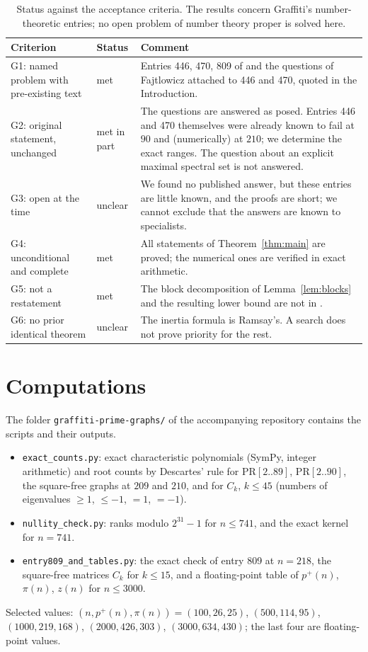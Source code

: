\documentclass[11pt]{amsart}
\theoremstyle{definition}
\theoremstyle{remark}
\newcommand{\PR}{\mathrm{PR}}
\newcommand{\pp}{p^{+}}
\begin{document}
\begin{table}[ht]
\centering\small
\begin{tabular}{@{}p{}p{}p{}@{}}
\toprule
Criterion & Status & Comment\\
\midrule
G1: named problem with pre-existing text & met & Entries 446, 470, 809 of \cite{WOW} and the questions of Fajtlowicz attached to 446 and 470, quoted in the Introduction.\\
G2: original statement, unchanged & met in part & The questions are answered as posed. Entries 446 and 470 themselves were already known to fail at $90$ and (numerically) at $210$; we determine the exact ranges. The question about an explicit maximal spectral set is not answered.\\
G3: open at the time & unclear & We found no published answer, but these entries are little known, and the proofs are short; we cannot exclude that the answers are known to specialists.\\
G4: unconditional and complete & met & All statements of Theorem~\ref{thm:main} are proved; the numerical ones are verified in exact arithmetic.\\
G5: not a restatement & met & The block decomposition of Lemma~\ref{lem:blocks} and the resulting lower bound are not in \cite{WOW}.\\
G6: no prior identical theorem & unclear & The inertia formula is Ramsay's. A search does not prove priority for the rest.\\
\bottomrule
\end{tabular}
\caption{Status against the acceptance criteria. The results concern Graffiti's number-theoretic entries; no open problem of number theory proper is solved here.}
\end{table}

\appendix
\section{Computations}\label{app:comp}
The folder \texttt{graffiti-prime-graphs/} of the accompanying repository contains the scripts and their outputs.
\begin{itemize}[leftmargin=*]
\item \texttt{exact\_counts.py}: exact characteristic polynomials (SymPy, integer arithmetic) and root counts by Descartes' rule for $\PR[2..89]$, $\PR[2..90]$, the square-free graphs at $209$ and $210$, and for $C_k$, $k\le45$ (numbers of eigenvalues $\ge1$, $\le-1$, $=1$, $=-1$).
\item \texttt{nullity\_check.py}: ranks modulo $2^{31}-1$ for $n\le741$, and the exact kernel for $n=741$.
\item \texttt{entry809\_and\_tables.py}: the exact check of entry 809 at $n=218$, the square-free matrices $C_k$ for $k\le15$, and a floating-point table of $\pp(n)$, $\pi(n)$, $z(n)$ for $n\le3000$.
\end{itemize}
Selected values: $(n,\pp(n),\pi(n))=(100,26,25)$, $(500,114,95)$, $(1000,219,168)$, $(2000,426,303)$, $(3000,634,430)$; the last four are floating-point values.
\end{document}
